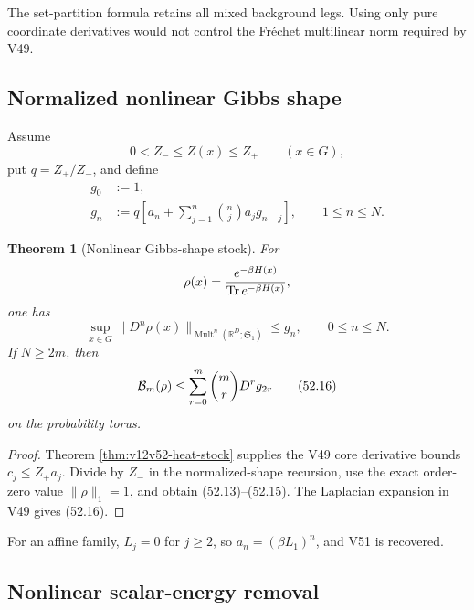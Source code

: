 \documentclass[11pt]{article}
\newtheorem{theorem}{Theorem}[section]
\theoremstyle{remark}
\begin{document}
The set-partition formula retains all mixed background legs.  Using
only pure coordinate derivatives would not control the Fr\'echet
multilinear norm required by V49.

\subsection{Normalized nonlinear Gibbs shape}

Assume
\begin{equation}
                         0<Z_-\leq Z(x)\leq Z_+
 \qquad(x\in G),                                  \tag{52.12}
\end{equation}
put \(q=Z_+/Z_-\), and define
\begin{align}
 g_0&:=1,                                         \tag{52.13}\\
 g_n&:=
 q\left[
 a_n+\sum_{j=1}^n\binom nj a_jg_{n-j}
 \right],
 \qquad1\leq n\leq N.                            \tag{52.14}
\end{align}

\begin{theorem}[Nonlinear Gibbs-shape stock]
\label{thm:v12v52-Gibbs}
For
\[
 \rho(x)={e^{-\beta H(x)}
          \over\operatorname{Tr}e^{-\beta H(x)}},
\]
one has
\begin{equation}
 \sup_{x\in G}
 \|D^n\rho(x)\|_{\operatorname{Mult}^n
  (\mathbb R^D;{\mathfrak S}_1)}
 \leq g_n,
 \qquad0\leq n\leq N.                            \tag{52.15}
\end{equation}
If \(N\geq2m\), then
\begin{equation}
 {\cal B}_m(\rho)
 \leq
 \sum_{r=0}^m\binom mrD^rg_{2r}                 \tag{52.16}
\end{equation}
on the probability torus.
\end{theorem}

\begin{proof}
Theorem \ref{thm:v12v52-heat-stock} supplies the V49 core derivative
bounds \(c_j\leq Z_+a_j\).  Divide by \(Z_-\) in the normalized-shape
recursion, use the exact order-zero value
\(\|\rho\|_1=1\), and obtain (52.13)--(52.15).
The Laplacian expansion in V49 gives (52.16).
\end{proof}

For an affine family, \(L_j=0\) for \(j\geq2\), so
\(a_n=(\beta L_1)^n\), and V51 is recovered.

\subsection{Nonlinear scalar-energy removal}
\end{document}
